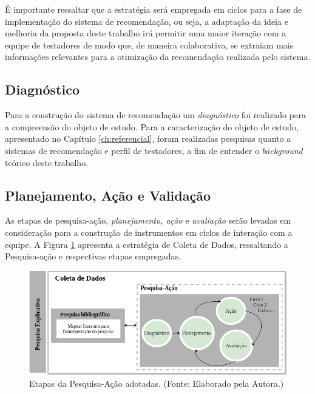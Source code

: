 É importante ressaltar que a estratégia será empregada em ciclos para a fase de implementação do sistema de recomendação, ou seja, a adaptação da ideia e melhoria da proposta deste trabalho irá permitir uma maior iteração com a equipe de testadores de modo que, de maneira colaborativa, se extraiam mais informações relevantes para a otimização da recomendação realizada pelo sistema.

\subsection{Diagnóstico}

Para a construção do sistema de recomendação um \textit{diagnóstico} foi realizado para a compreensão do objeto de estudo. Para a caracterização do objeto de estudo, apresentado no Capítulo \ref{ch:referencial}, foram realizadas pesquisas quanto a sistemas de recomendação e perfil de testadores, a fim de entender o \textit{background} teórico deste trabalho.


\subsection{Planejamento, Ação e Validação}

As etapas de pesquisa-ação, \textit{planejamento, ação} e \textit{avaliação} serão levadas em consideração para a construção de instrumentos em ciclos de interação com a equipe. A Figura \ref{fig:etapasPesquisaAcaoAdotas} apresenta a estratégia de Coleta de Dados, ressaltando a Pesquisa-ação e respectivas etapas empregadas.

        \begin{figure}[H]
          \centering
          \includegraphics[width=12cm]{figuras/etapasPesquisaAcaoAdotadas.png}
          \caption{Etapas da Pesquisa-Ação adotadas. (Fonte: Elaborado pela Autora.)}
          \label{fig:etapasPesquisaAcaoAdotas}

        \end{figure}

